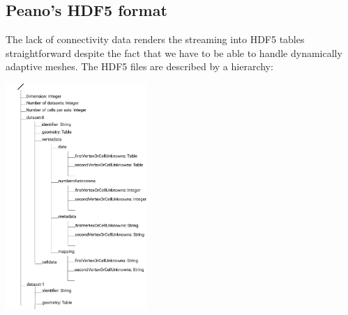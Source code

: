 \subsection{Peano's HDF5 format}

The lack of connectivity data renders the streaming into HDF5 tables
straightforward despite the fact that we have to be able to handle dynamically
adaptive meshes.
The HDF5 files are described by a hierarchy:

\begin{center} 
 \includegraphics[width=0.4\textwidth]{81_blockstructured-file-format/hierarchy.pdf}
\end{center}


